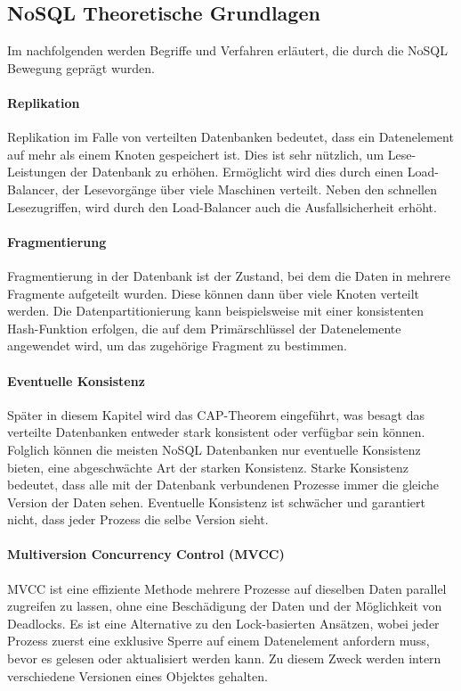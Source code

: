 \subsection{NoSQL Theoretische Grundlagen}
\label{ch:grundlagen:sec:NoSQL:NoSQLBasics}

Im nachfolgenden werden Begriffe und Verfahren erläutert, die durch die NoSQL Bewegung geprägt wurden.

\paragraph{Replikation} Replikation im Falle von verteilten Datenbanken bedeutet, dass ein Datenelement auf mehr als einem Knoten gespeichert ist. Dies ist sehr nützlich, um Lese-Leistungen der Datenbank zu erhöhen. Ermöglicht wird dies durch einen Load-Balancer, der Lesevorgänge über viele Maschinen verteilt. Neben den schnellen Lesezugriffen, wird durch den Load-Balancer auch die Ausfallsicherheit erhöht.  

\paragraph{Fragmentierung} Fragmentierung in der Datenbank ist der Zustand, bei dem die Daten in mehrere Fragmente aufgeteilt wurden. Diese können dann über viele Knoten verteilt werden. Die Datenpartitionierung kann beispielsweise mit einer konsistenten Hash-Funktion erfolgen, die auf dem Primärschlüssel der Datenelemente angewendet wird, um das zugehörige Fragment zu bestimmen.

\paragraph{Eventuelle Konsistenz} Später in diesem Kapitel wird das CAP-Theorem eingeführt, was besagt das verteilte Datenbanken entweder stark konsistent oder verfügbar sein können. Folglich können die meisten NoSQL Datenbanken nur eventuelle Konsistenz bieten, eine abgeschwächte Art der starken Konsistenz. Starke Konsistenz bedeutet, dass alle mit der Datenbank verbundenen Prozesse immer die gleiche Version der Daten sehen. Eventuelle Konsistenz ist schwächer und garantiert nicht, dass jeder Prozess die selbe Version sieht.

\paragraph{Multiversion Concurrency Control (MVCC)} MVCC ist eine effiziente Methode mehrere Prozesse auf dieselben Daten parallel zugreifen zu lassen, ohne eine Beschädigung der Daten und der Möglichkeit von Deadlocks. Es ist eine Alternative zu den Lock-basierten Ansätzen, wobei jeder Prozess zuerst eine exklusive Sperre auf einem Datenelement anfordern muss, bevor es gelesen oder aktualisiert werden kann. Zu diesem Zweck werden intern verschiedene Versionen eines Objektes gehalten.

